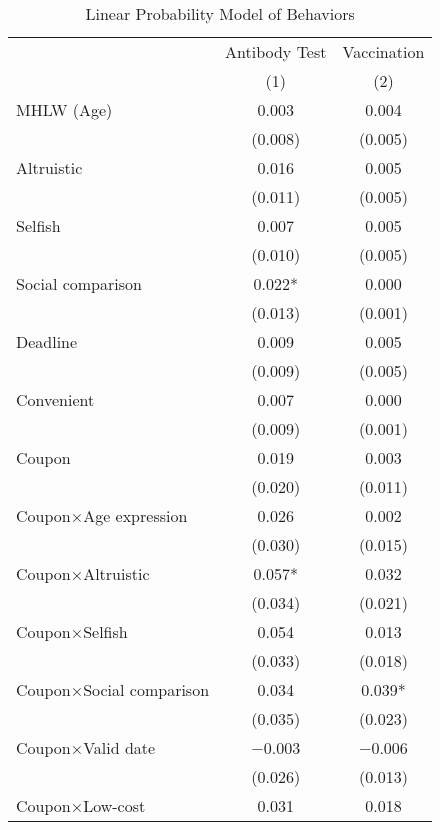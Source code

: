 \begin{table}

\caption{Linear Probability Model of Behaviors \label{tab:act-reg}}
\centering
\fontsize{9}{11}\selectfont
\begin{threeparttable}
\begin{tabular}[t]{lcc}
\toprule
\multicolumn{1}{c}{ } & \multicolumn{1}{c}{Antibody Test} & \multicolumn{1}{c}{Vaccination} \\
\cmidrule(l{3pt}r{3pt}){2-2} \cmidrule(l{3pt}r{3pt}){3-3}
  & (1) & (2)\\
\midrule
MHLW (Age) & \num{0.003} & \num{0.004}\\
 & (\num{0.008}) & (\num{0.005})\\
Altruistic & \num{0.016} & \num{0.005}\\
 & (\num{0.011}) & (\num{0.005})\\
Selfish & \num{0.007} & \num{0.005}\\
 & (\num{0.010}) & (\num{0.005})\\
Social comparison & \num{0.022}* & \num{0.000}\\
 & (\num{0.013}) & (\num{0.001})\\
Deadline & \num{0.009} & \num{0.005}\\
 & (\num{0.009}) & (\num{0.005})\\
Convenient & \num{0.007} & \num{0.000}\\
 & (\num{0.009}) & (\num{0.001})\\
Coupon & \num{0.019} & \num{0.003}\\
 & (\num{0.020}) & (\num{0.011})\\
Coupon×Age expression & \num{0.026} & \num{0.002}\\
 & (\num{0.030}) & (\num{0.015})\\
Coupon×Altruistic & \num{0.057}* & \num{0.032}\\
 & (\num{0.034}) & (\num{0.021})\\
Coupon×Selfish & \num{0.054} & \num{0.013}\\
 & (\num{0.033}) & (\num{0.018})\\
Coupon×Social comparison & \num{0.034} & \num{0.039}*\\
 & (\num{0.035}) & (\num{0.023})\\
Coupon×Valid date & \num{-0.003} & \num{-0.006}\\
 & (\num{0.026}) & (\num{0.013})\\
Coupon×Low-cost & \num{0.031} & \num{0.018}\\

\end{tabular}
\end{threeparttable}
\end{table}
